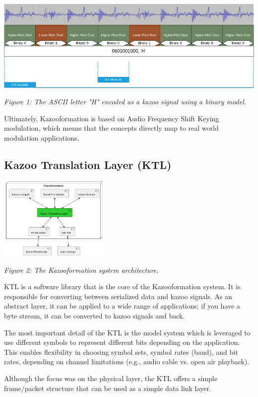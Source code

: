 \documentclass[]{article}
\begin{document}
\begin{center}
  \includegraphics[width=0.7\linewidth]{images/kazoo_signal.png}

  \textit{Figure 1: The ASCII letter "H" encoded as a kazoo signal using a binary model.}
\end{center}

Ultimately, Kazooformation is based on Audio Frequency Shift Keying modulation, which means that the concepts directly map to real world modulation applications.

\subsection{Kazoo Translation Layer (KTL)}

\begin{center}
  \includegraphics[width=0.4\textwidth]{images/org_diagram.png}

  \textit{Figure 2: The Kazooformation system architecture.}
\end{center}

KTL is a software library that is the core of the Kazooformation system. It is responsible for converting between serialized data and kazoo signals. As an abstract layer, it can be applied to a wide range of applications; if you have a byte stream, it can be converted to kazoo signals and back.

The most important detail of the KTL is the model system which is leveraged to use different symbols to represent different bits depending on the application. This enables flexibility in choosing symbol sets, symbol rates (baud), and bit rates, depending on channel limitations (e.g., audio cable vs. open air playback).

Although the focus was on the physical layer, the KTL offers a simple frame/packet structure that can be used as a simple data link layer.
\end{document}
